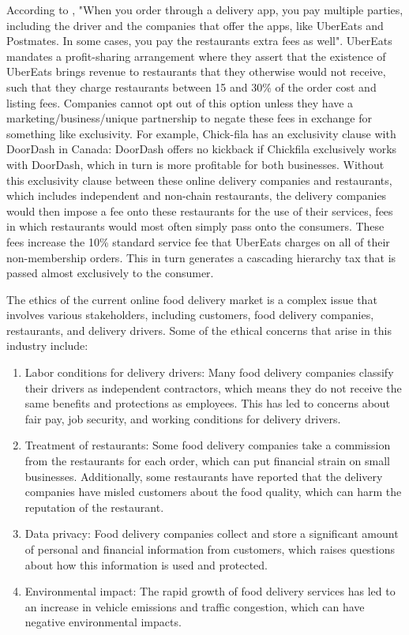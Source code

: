 \documentclass[10pt,twocolumn]{article}
\begin{document}
According to , "When you order through a delivery app, you pay multiple parties, including the driver and the companies that offer the apps, like UberEats and Postmates. In some cases, you pay the restaurants extra fees as well". UberEats mandates a profit-sharing arrangement where they assert that the existence of UberEats brings revenue to restaurants that they otherwise would not receive, such that they charge restaurants between 15 and 30\% of the order cost and listing fees. Companies cannot opt out of this option unless they have a marketing/business/unique partnership to negate these fees in exchange for something like exclusivity. For example, Chick-fila has an exclusivity clause with DoorDash in Canada: DoorDash offers no kickback if Chickfila exclusively works with DoorDash, which in turn is more profitable for both businesses. Without this exclusivity clause between  these online delivery companies and restaurants, which includes independent and non-chain restaurants, the delivery companies would then impose a fee onto these restaurants for the use of their services, fees in which restaurants would most often simply pass onto the consumers. These fees increase the 10\% standard service fee that UberEats charges on all of their non-membership orders. This in turn generates a cascading hierarchy tax that is passed almost exclusively to the consumer. 

The ethics of the current online food delivery market is a complex issue that involves various stakeholders, including customers, food delivery companies, restaurants, and delivery drivers. Some of the ethical concerns that arise in this industry include\cite{ResearchGate2}:

\begin{enumerate}
    \item Labor conditions for delivery drivers: Many food delivery companies classify their drivers as independent contractors, which means they do not receive the same benefits and protections as employees. This has led to concerns about fair pay, job security, and working conditions for delivery drivers.
    \item Treatment of restaurants: Some food delivery companies take a commission from the restaurants for each order, which can put financial strain on small businesses. Additionally, some restaurants have reported that the delivery companies have misled customers about the food quality, which can harm the reputation of the restaurant.
    \item Data privacy: Food delivery companies collect and store a significant amount of personal and financial information from customers, which raises questions about how this information is used and protected.
    \item Environmental impact: The rapid growth of food delivery services has led to an increase in vehicle emissions and traffic congestion, which can have negative environmental impacts.
\end{enumerate}
\end{document}
